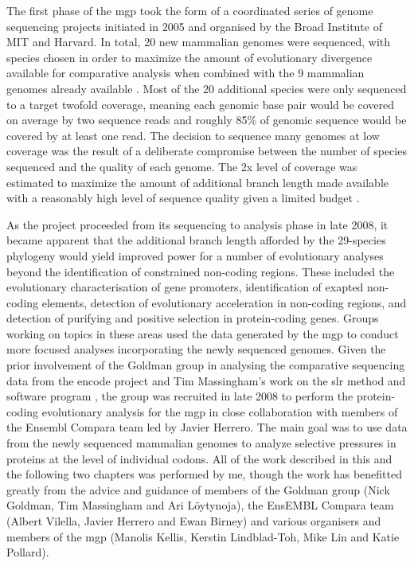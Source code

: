 The first phase of the \ac{mgp} took the form of a coordinated series
of genome sequencing projects initiated in 2005 and organised by the
Broad Institute of MIT and Harvard. In total, 20 new mammalian genomes
were sequenced, with species chosen in order to maximize the amount of
evolutionary divergence available for comparative analysis when
combined with the 9 mammalian genomes already available
\citep{Margulies2005Initial}. Most of the 20 additional species were
only sequenced to a target twofold coverage, meaning each genomic base
pair would be covered on average by two sequence reads and roughly
85\% of genomic sequence would be covered by at least one read. The
decision to sequence many genomes at low coverage was the result of a
deliberate compromise between the number of species sequenced and the
quality of each genome. The 2x level of coverage was estimated to
maximize the amount of additional branch length made available with a
reasonably high level of sequence quality given a limited budget
\citep{Margulies2007}.

As the project proceeded from its sequencing to analysis phase in late
2008, it became apparent that the additional branch length afforded by
the 29-species phylogeny would yield improved power for a number of
evolutionary analyses beyond the identification of constrained
non-coding regions. These included the evolutionary characterisation
of gene promoters, identification of exapted non-coding elements,
detection of evolutionary acceleration in non-coding regions, and
detection of purifying and positive selection in protein-coding
genes. Groups working on topics in these areas used the data generated
by the \ac{mgp} to conduct more focused analyses incorporating the
newly sequenced genomes. Given the prior involvement of the Goldman
group in analysing the comparative sequencing data from the
\ac{encode} project \citep{Margulies2007,Birney2007} and Tim
Massingham's work on the \ac{slr} method and software program
\citep{Massingham2005}, the group was recruited in late 2008 to
perform the protein-coding evolutionary analysis for the \ac{mgp} in
close collaboration with members of the Ensembl Compara team led by
Javier Herrero. The main goal was to use data from the newly sequenced
mammalian genomes to analyze selective pressures in proteins at the
level of individual codons. All of the work described in this and the
following two chapters was performed by me, though the work has
benefitted greatly from the advice and guidance of members of the
Goldman group (Nick Goldman, Tim Massingham and Ari L\"{o}ytynoja),
the EnsEMBL Compara team (Albert Vilella, Javier Herrero and Ewan
Birney) and various organisers and members of the \ac{mgp} (Manolis
Kellis, Kerstin Lindblad-Toh, Mike Lin and Katie Pollard).

